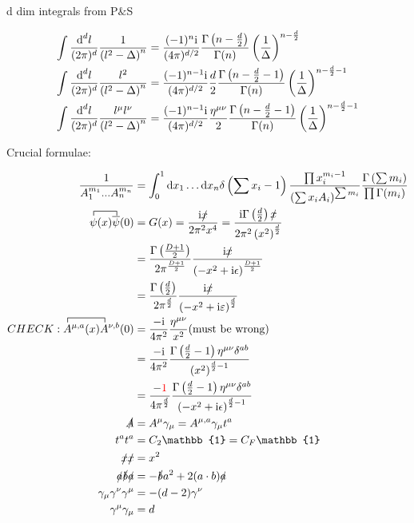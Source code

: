 \ifdefined\mainprogram{}
\else

\fi

d dim integrals from P$\&$S

\begin{align}
\int \frac{\text{d} ^d l}{(2\pi)^d} \frac{1}{\left(l^2-\Delta\right)^n} 
&=
\frac{(-1)^n\text{i}}{(4\pi)^{d/2}} \frac{\Gamma\left(n-\frac{d}{2}\right)}{\Gamma(n)}\left(\frac{1}{\Delta}\right)^{n-\frac{d}{2}}
\\
\int \frac{\text{d} ^d l}{(2\pi)^d} \frac{l^2}{\left(l^2-\Delta\right)^n} 
&=
\frac{(-1)^{n-1}\text{i}}{(4\pi)^{d/2}}\frac{d}{2} \frac{\Gamma\left(n-\frac{d}{2}-1\right)}{\Gamma(n)}\left(\frac{1}{\Delta}\right)^{n-\frac{d}{2}-1}
\\
\int \frac{\text{d} ^d l}{(2\pi)^d} \frac{l^	\mu l^\nu}{\left(l^2-\Delta\right)^n} 
&=
\frac{(-1)^{n-1}\text{i}}{(4\pi)^{d/2}}\frac{\eta^{\mu \nu}}{2} \frac{\Gamma\left(n-\frac{d}{2}-1\right)}{\Gamma(n)}\left(\frac{1}{\Delta}\right)^{n-\frac{d}{2}-1}
\end{align}

Crucial formulae:

\begin{align}
\frac{1}{A_1^{m_1}...A_n^{m_n}} 
&= \int_{0}^{1} \dx x_1 \dots \dx x_n \delta\left(\sum x_i -1\right) \frac{\prod x_i^{m_i-1}}{\left(\sum x_iA_i\right)^{\sum m_i}}\frac{\Gamma\left(\sum m_i\right)}{\prod \Gamma(m_i)}
\label{denominatorproductAsIntegral}
\\
\contraction{}{\psi}{(x)}{\overline{\psi}}\psi (x) \overline \psi (0) 
&=
\gf(x)= \frac{\imag \slashed{x}}{2\pi^2x^4}
= \frac{\imag \Gamma\left({\frac{d}{2}}\right) \slashed{x}}{2\pi^2\left(x^2\right)^\frac{d}{2}}
\\
&=
\frac{\Gamma\left(\frac{D+1}{2}\right)}{2\pi^{\frac{D+1}{2}}}\frac{\imag \slashed x}{\left(-x^2+\imag \epsilon\right)^{\frac{D+1}{2}}}
\\
&=
\frac{\Gamma\left(\frac{d}{2}\right)}{2\pi^{\frac{d}{2}}}\frac{\imag \slashed x}{\left(-x^2+\imag \varepsilon\right)^{\frac{d}{2}}}
\\
CHECK: \contraction{}{A}{^{\mu,a}(x)}{\overline{A}} A^{\mu,a}(x)A^{\nu,b}(0) 
&= \frac{-\imag}{4 \pi^2} \frac{\metric^{\mu \nu}}{x^2} \text{(must be wrong)}
\\
&=
\frac{-\imag}{4 \pi^2} \frac{\Gamma\left(\frac{d}{2}-1\right)\metric^{\mu \nu}\delta^{ab}}{\left(x^2\right)^{\frac{d}{2}-1}} 
\\
&=
\frac{-\color{red}{1}}{4 \pi^{\frac{d}{2}}} \frac{\Gamma\left(\frac{d}{2}-1\right)\metric^{\mu \nu}\delta^{ab}}{\left(-x^2+\imag\epsilon\right)^{\frac{d}{2}-1}} 
\\
\slashed A &= A^\mu \gamma_\mu = A^{\mu,a} \gamma_\mu t^a
\\
t^a t^a &= C_2 \mathbb{1}  = C_F \mathbb{1}
\\
\slashed x \slashed x 
&= x^2
\\
\slashed a \slashed b \slashed a 
&=
- \slashed b a^2 +2 \skpt{a}{b}\slashed a
\\
\gamma_\mu \gamma^\nu \gamma^\mu 
&=
-(d-2)\gamma^\nu
\\
\gamma^\mu \gamma_\mu 
&=
d
\end{align}


